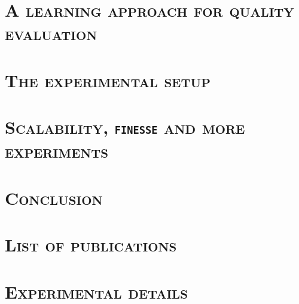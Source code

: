 \documentclass[12pt, twoside]{book}
\begin{document}
    \chapter{\textsc{A learning approach for quality evaluation}}
        \label{chap::learned_evaluation}
        

    \chapter{\textsc{The experimental setup}}
        \label{chap::experiments}
        

    \chapter{\textsc{Scalability, \texttt{finesse} and more experiments}}
        \label{chap::more_experiments}
        

    \chapter{\textsc{Conclusion}}
        \label{chap::conclusion}
        
    
    \appendix
    \chapter{\textsc{List of publications}}
        
        \chapter{\textsc{Experimental details}}
        

    \printindex

    \printbibliography[heading=bibintoc]
\end{document}
